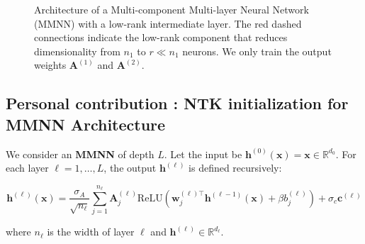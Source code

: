 \documentclass[11pt]{article}
\newcommand{\ReLU}{\mathrm{ReLU}}
\begin{document}
\begin{figure}[htbp]
    \caption{Architecture of a Multi-component Multi-layer Neural Network (MMNN) with a low-rank intermediate layer. The red dashed connections indicate the low-rank component that reduces dimensionality from $n_1$ to $r \ll n_1$ neurons.
    We only train the output weights $\bm{A}^{(1)}$ and $\bm{A}^{(2)}$.}
    \label{fig:mmnn_architecture}
\end{figure}


\subsection{Personal contribution : NTK initialization for MMNN Architecture}

\begin{tcolorbox}[colback=yellow!15,colframe=yellow!80!black,title={\textbf{Definition: MMNN Architecture}},enhanced,drop shadow,boxrule=2pt]
We consider an \textbf{MMNN} of depth $L$. Let the input be $\bm{h}^{(0)}(\bm{x}) = \bm{x} \in \mathbb{R}^{d_0}$. For each layer $\ell = 1, \dots, L$, the output $\bm{h}^{(\ell)}$ is defined recursively:

\begin{equation}
    \bm{h}^{(\ell)}(\bm{x}) = \frac{\sigma_A}{\sqrt{n_\ell}} \sum_{j=1}^{n_\ell} \bm{A}_j^{(\ell)} \ReLU\left(\bm{w}_j^{(\ell)\top} \bm{h}^{(\ell-1)}(\bm{x}) + \beta b_j^{(\ell)}\right) + \sigma_c \bm{c}^{(\ell)}
\end{equation}

where $n_\ell$ is the width of layer $\ell$ and $\bm{h}^{(\ell)} \in \mathbb{R}^{d_\ell}$.
\end{tcolorbox}
\end{document}
